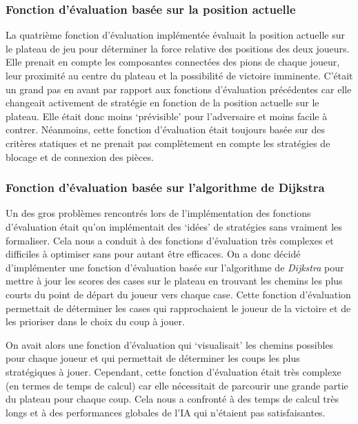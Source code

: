 \subsubsection{Fonction d'évaluation basée sur la position actuelle}
La quatrième fonction d'évaluation implémentée évaluait la position actuelle sur le plateau de jeu pour déterminer
la force relative des positions des deux joueurs. Elle prenait en compte les composantes connectées des pions de chaque joueur,
leur proximité au centre du plateau et la possibilité de victoire imminente.
C'était un grand pas en avant par rapport aux fonctions d'évaluation précédentes car elle changeait activement
de stratégie en fonction de la position actuelle sur le plateau. Elle était donc moins `prévisible' pour l'adversaire et 
moins facile à contrer.
Néanmoins, cette fonction d'évaluation était toujours basée sur des critères statiques et ne prenait pas complètement
en compte les stratégies de blocage et de connexion des pièces.

\subsubsection{Fonction d'évaluation basée sur l'algorithme de Dijkstra}
Un des gros problèmes rencontrés lors de l'implémentation des fonctions d'évaluation était qu'on implémentait
des `idées' de stratégies sans vraiment les formaliser. Cela nous a conduit à des fonctions d'évaluation très complexes
et difficiles à optimiser sans pour autant être efficaces.
On a donc décidé d'implémenter une fonction d'évaluation basée sur l'algorithme de \emph{Dijkstra} pour mettre à jour
les scores des cases sur le plateau en trouvant les chemins les plus courts du point de départ du joueur vers chaque case.
Cette fonction d'évaluation permettait de déterminer les cases qui rapprochaient le joueur de la victoire et de les
prioriser dans le choix du coup à jouer.

On avait alors une fonction d'évaluation qui `visualisait' les chemins possibles pour chaque joueur et qui permettait
de déterminer les coups les plus stratégiques à jouer. 
Cependant, cette fonction d'évaluation était très complexe (en termes de temps de calcul) car elle nécessitait de parcourir
une grande partie du plateau pour chaque coup. Cela nous a confronté à des temps de calcul très longs et à des performances
globales de l'IA qui n'étaient pas satisfaisantes.

